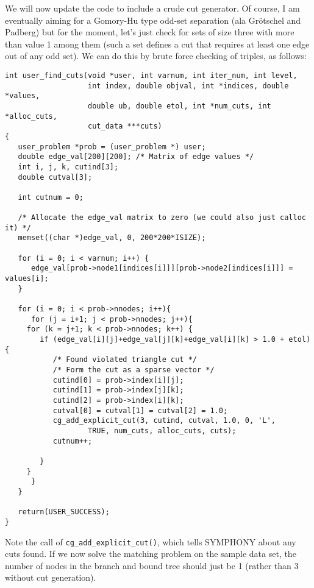 \documentclass[11pt]{article}
\begin{document}
We will now update the code to include a crude cut generator. Of course, I am
eventually aiming for a Gomory-Hu type odd-set separation (ala Gr\"otschel and
Padberg) but for the moment, let's just check for sets of size three with more
than value 1 among them (such a set defines a cut that requires at least one
edge out of any odd set). We can do this by brute force checking of triples,
as follows: 

\begin{verbatim}
int user_find_cuts(void *user, int varnum, int iter_num, int level,
                   int index, double objval, int *indices, double *values,
                   double ub, double etol, int *num_cuts, int *alloc_cuts, 
                   cut_data ***cuts)
{
   user_problem *prob = (user_problem *) user;
   double edge_val[200][200]; /* Matrix of edge values */
   int i, j, k, cutind[3];
   double cutval[3];
   
   int cutnum = 0;

   /* Allocate the edge_val matrix to zero (we could also just calloc it) */
   memset((char *)edge_val, 0, 200*200*ISIZE);
   
   for (i = 0; i < varnum; i++) {
      edge_val[prob->node1[indices[i]]][prob->node2[indices[i]]] = values[i];
   }
   
   for (i = 0; i < prob->nnodes; i++){
      for (j = i+1; j < prob->nnodes; j++){
	 for (k = j+1; k < prob->nnodes; k++) {
	    if (edge_val[i][j]+edge_val[j][k]+edge_val[i][k] > 1.0 + etol) {
	       /* Found violated triangle cut */
	       /* Form the cut as a sparse vector */
	       cutind[0] = prob->index[i][j];
	       cutind[1] = prob->index[j][k];
	       cutind[2] = prob->index[i][k];
	       cutval[0] = cutval[1] = cutval[2] = 1.0;
	       cg_add_explicit_cut(3, cutind, cutval, 1.0, 0, 'L',
				   TRUE, num_cuts, alloc_cuts, cuts);
	       cutnum++;
	       
	    }
	 }
      }
   }

   return(USER_SUCCESS);
}

\end{verbatim}

Note the call of \texttt{cg\_add\_explicit\_cut()}, which tells SYMPHONY about
any cuts found. If we now solve the matching problem on the sample data set,
the number of nodes in the branch and bound tree should just be 1 (rather than
3 without cut generation).
\end{document}
